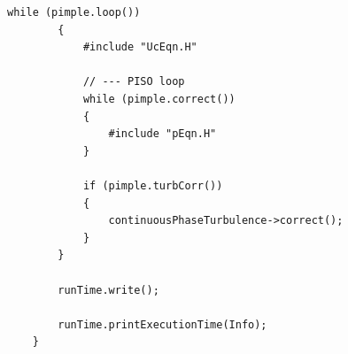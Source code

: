 





\ifcode
\begin{lstlisting}[caption=from MPPICFoam.C]
 while (pimple.loop())
        {
            #include "UcEqn.H"

            // --- PISO loop
            while (pimple.correct())
            {
                #include "pEqn.H"
            }

            if (pimple.turbCorr())
            {
                continuousPhaseTurbulence->correct();
            }
        }

        runTime.write();

        runTime.printExecutionTime(Info);
    }
\end{lstlisting}
\fi


